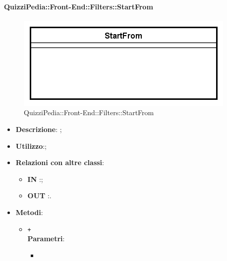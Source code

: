 \paragraph[QuizziPedia::Front-End::Filters::StartFrom]{QuizziPedia::Front-End::Filters::StartFrom}
\begin{figure} [ht]
	\centering
	\includegraphics[scale=0.80]{UML/Classi/Front-End/QuizziPedia_Front-end_Filters_StartFrom.png}
	\caption{QuizziPedia::Front-End::Filters::StartFrom}
\end{figure} \FloatBarrier
\begin{itemize}
	\item \textbf{Descrizione}: ;
	\item \textbf{Utilizzo}:;
	\item \textbf{Relazioni con altre classi}:
	\begin{itemize}
		\item \textbf{IN} \texttt{}:; 
		\item \textbf{OUT} \texttt{}:.
	\end{itemize}
	\item \textbf{Metodi}:
	\begin{itemize}
		\item \texttt{+} \texttt{} \\ 
		\textbf{Parametri}:
		\begin{itemize}
			\item \texttt{} \\
		\end{itemize}
	\end{itemize}
\end{itemize}

